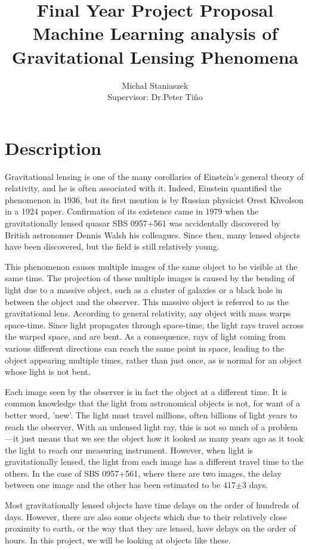 \documentclass[10pt,a4paper]{article}
\title{\small{Final Year Project Proposal}\\\Large{Machine Learning analysis of Gravitational Lensing Phenomena}}
\author{Micha{\l} Staniaszek \\\small{Supervisor: Dr.Peter Ti\v{n}o}}
\begin{document}
\maketitle

\section*{Description}

Gravitational lensing is one of the many corollaries of Einstein's general theory of relativity, and he is often associated with it. Indeed, Einstein quantified the phenomenon in 1936, but its first mention is by Russian physicist Orest Khvolson in a 1924 paper. Confirmation of its existence came in 1979 when the gravitationally lensed quasar SBS 0957+561 was accidentally discovered by British astronomer Dennis Walsh his colleagues. Since then, many lensed objects have been discovered, but the field is still relatively young.
\par This phenomenon causes multiple images of the same object to be visible at the same time. The projection of these multiple images is caused by the bending of light due to a massive object, such as a cluster of galaxies or a black hole in between the object and the observer. This massive object is referred to as the gravitational lens. According to general relativity, any object with mass warps space-time. Since light propagates through space-time, the light rays travel across the warped space, and are bent. As a consequence, rays of light coming from various different directions can reach the same point in space, leading to the object appearing multiple times, rather than just once, as is normal for an object whose light is not bent.
\par Each image seen by the observer is in fact the object at a different time. It is common knowledge that the light from astronomical objects is not, for want of a better word, 'new'. The light must travel millions, often billions of light years to reach the observer. With an unlensed light ray, this is not so much of a problem---it just means that we see the object how it looked as many years ago as it took the light to reach our measuring instrument. However, when light is gravitationally lensed, the light from each image has a different travel time to the others. In the case of SBS 0957+561, where there are two images, the delay between one image and the other has been estimated to be 417$\pm$3 days.
\par Most gravitationally lensed objects have time delays on the order of hundreds of days. However, there are also some objects which due to their relatively close proximity to earth, or the way that they are lensed, have delays on the order of hours. In this project, we will be looking at objects like these. 
\end{document}

